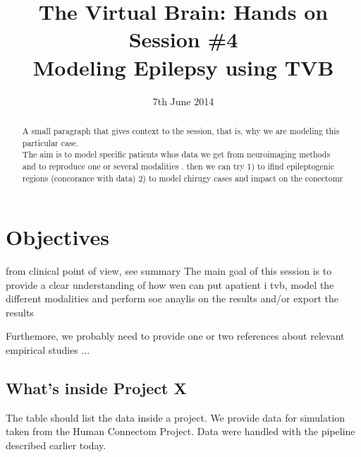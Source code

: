 \documentclass{tufte-handout}
\title{The Virtual Brain: Hands on Session \#4 \\
Modeling Epilepsy using TVB}
\date{7th June 2014}
\begin{document}
\maketitle %

\begin{abstract}
\noindent A small paragraph that gives context to the session, that is, 
why we are modeling this particular case.\\
The aim is to model specific patients whos data we get from neuroimaging methods and to reproduce one or several modalities . then we can try 
1) to ifind epileptogenic regions (concorance with data) 
2) to model chirugy cases and impact on the conectomr
\end{abstract}


 

\section{Objectives}\label{sec:objectives}
from clinical point of view, see summary
The main goal of this session is to provide a clear understanding of how wen can put apatient i tvb, model the different modalities and perform soe anaylis on the results and/or export the results

Furthemore, we probably need to provide one or two references about relevant
empirical studies ...


\subsection{What's inside Project X }\label{sec:project_data}

The table should list the data inside a project. 
We provide data for simulation taken from the Human Connectom Project. Data were handled with the pipeline described earlier today.
\end{document}

